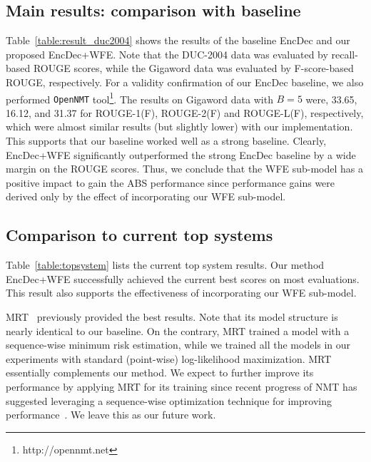 \documentclass[11pt]{article}
\begin{document}
\subsection{Main results: comparison with baseline}
   Table~\ref{table:result_duc2004} shows the results of the baseline EncDec and our proposed EncDec+WFE.
   Note that the DUC-2004 data was evaluated by recall-based ROUGE scores, while the Gigaword data was evaluated by F-score-based ROUGE, respectively.
   For a validity confirmation of our EncDec baseline, we also performed {\tt OpenNMT} tool\footnote{{{http://opennmt.net}}}.
    The results on Gigaword data with $B=5$ were, 33.65, 16.12, and 31.37 for ROUGE-1(F), ROUGE-2(F) and ROUGE-L(F), respectively, which were almost similar results (but slightly lower) with our implementation.
    This supports that our baseline worked well as a strong baseline.
   Clearly, EncDec+WFE significantly outperformed the strong EncDec baseline by a wide margin on the ROUGE scores. 
    Thus, we conclude that the WFE sub-model has a positive impact to gain the ABS performance
   since performance gains were derived only by the effect of incorporating our WFE sub-model. 


\subsection{Comparison to current top systems}
   Table~\ref{table:topsystem} lists the current top system results.
   Our method EncDec+WFE successfully achieved the current best scores on most evaluations.
   This result also supports the effectiveness of incorporating our WFE sub-model.
   
   MRT~\cite{DBLP:journals/corr/AyanaSLS16} previously provided the best results.
   Note that its model structure is nearly identical to our baseline.
   On the contrary, MRT trained a model with a sequence-wise minimum risk estimation, while we trained all the models in our experiments with standard (point-wise) log-likelihood maximization.
   MRT essentially complements our method.
   We expect to further improve its performance by applying MRT for its training since recent progress of NMT has suggested leveraging a sequence-wise optimization technique for improving performance~\cite{wiseman-rush:2016:EMNLP2016,shen-EtAl:2016:P16-1}.
   We leave this as our future work.
\end{document}
